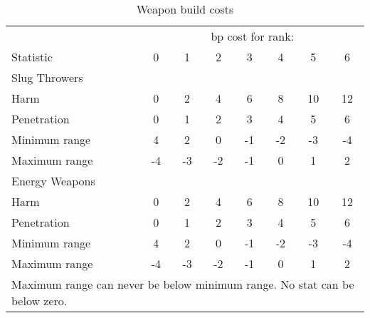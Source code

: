 
\begin{table}[ht]\centering
\begin{tabular}{l ccccccc}
\toprule
{}		& \multicolumn{7}{c}{bp cost for rank:} \\
Statistic	& 0	&1&2&3&4&5&6 \\
\midrule
Slug Throwers \\
\midrule
Harm		& 0	& 2	& 4	& 6	& 8	& 10	& 12\\
Penetration	& 0	& 1	& 2	& 3	& 4	& 5	& 6 \\
Minimum range	& 4	& 2	& 0	& -1	& -2	& -3	& -4\\
Maximum range	& -4	& -3	& -2	& -1	& 0	& 1	& 2 \\
\midrule
Energy Weapons \\
\midrule
Harm		&  0 &  2 &  4 &  6 &  8 & 10 & 12 \\
Penetration	&  0 &  1 &  2 &  3 &  4 &  5 &  6 \\
Minimum range	&  4 &  2 &  0 & -1 & -2 & -3 & -4 \\
Maximum range	& -4 & -3 & -2 & -1 &  0 &  1 &  2 \\
\bottomrule
\multicolumn{8}{p{0.6\columnwidth}}{
Maximum range can never be below minimum range.
\newline
No stat can be below zero.
}
\end{tabular}
\caption{Weapon build costs}
\label{tab:weapon-build-costs}
\end{table}
